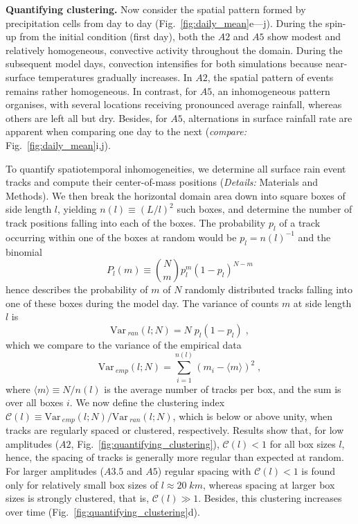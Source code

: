 \documentclass{article}
\def\Var{{\textrm{Var}}\,}
\begin{document}
\noindent
{\bf Quantifying clustering.}
Now consider the spatial pattern formed by precipitation cells from day to day (Fig.~\ref{fig:daily_mean}e---j). 
During the spin-up from the initial condition (first day), both the $A2$ and $A5$ show modest and relatively homogeneous, convective activity throughout the domain. 
During the subsequent model days, convection intensifies for both simulations because near-surface temperatures gradually increases.%
In $A2$, the spatial pattern of events remains rather homogeneous.
In contrast, for $A5$, an inhomogeneous pattern organises, with several locations receiving pronounced average rainfall, whereas others are left all but dry. 
Besides, for $A5$, alternations in surface rainfall rate are apparent when comparing one day to the next ({\it compare:} Fig.~\ref{fig:daily_mean}i,j).

To quantify spatiotemporal inhomogeneities, we determine all surface rain event tracks and compute their center-of-mass positions ({\it Details:} Materials and Methods).
We then break the horizontal domain area down into square boxes of side length $l$, yielding $n(l)\equiv (L/l)^2$ such boxes, and determine the number of track positions falling into each of the boxes.
The probability $p_l$ of a track occurring within one of the boxes at random would be $p_l=n(l)^{-1}$
and the binomial
\begin{equation}
    P_l(m)\equiv \binom{N}{m} p_l^m\left( 1-p_l \right)^{N-m}
    \label{eq:binomial}
\end{equation}
hence describes the probability of $m$ of $N$ randomly distributed tracks falling into one of these boxes during the model day.
The variance of counts $m$ at side length $l$ is \cite{feller1957introduction} 
\begin{equation}
    \Var_{ran}(l;N) = N\;p_l(1-p_l)\;,
    \label{eq:var_ran}
\end{equation}
which we compare to the variance of the empirical data 
\begin{equation}
    \Var_{emp}(l;N) = \sum_{i=1}^{n(l)}(m_i-\langle m\rangle)^2\;,
    \label{eq:var_emp}
\end{equation}
where $\langle m\rangle\equiv N/n(l)$ is the average number of tracks per box, and the sum is over all boxes $i$.
We now define the clustering index $\mathcal{C}(l)\equiv \Var_{emp}(l;N)/\Var_{ran}(l;N)$, which is below or above unity, when tracks are regularly spaced or clustered, respectively.
Results show that, for low amplitudes ($A2$, Fig.~\ref{fig:quantifying_clustering}), $\mathcal{C}(l)<1$ for all box sizes $l$, hence, the spacing of tracks is generally more regular than expected at random.
For larger amplitudes ($A3.5$ and $A5$) regular spacing \cite{tompkins2017organization} with $\mathcal{C}(l)<1$ is found only for relatively small box sizes of $l\approx 20\;km$, whereas spacing at larger box sizes is strongly clustered, that is, $\mathcal{C}(l)\gg 1$.
Besides, this clustering increases over time (Fig.~\ref{fig:quantifying_clustering}d).
\end{document}
